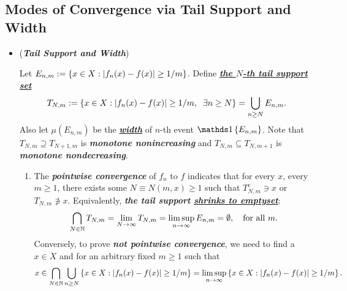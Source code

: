 \documentclass[11pt]{article}
\begin{document}
\subsection{Modes of Convergence via Tail Support and Width}
\begin{itemize}
\item \begin{remark} (\textit{\textbf{Tail Support and Width}})
\begin{definition}
Let $E_{n,m} := \left\{x \in X: \left\lvert f_n(x) - f(x) \right\rvert \ge 1/m\right\}$. Define \underline{\emph{\textbf{the $N$-th tail support set}}}
\begin{align*}
T_{N,m}:= \left\{x \in X: \left\lvert f_n(x) - f(x) \right\rvert \ge 1/m,\;\;\exists n\ge N\right\} = \bigcup_{n\ge N}E_{n,m}.
\end{align*} Also  let $\mu(E_{n,m})$ be the \underline{\emph{\textbf{width}}} of $n$-th event $\ind{E_{n, m}}$.  Note that $T_{N,m}\supseteq T_{N+1,m}$ is \emph{\textbf{monotone nonincreasing}} and  $T_{N,m}\subseteq T_{N,m+1}$ is \emph{\textbf{monotone nondecreasing}}.
\end{definition}
\begin{enumerate}
\item The \emph{\textbf{pointwise convergence}} of $f_{n}$ to $f$ indicates that for every $x$, every $m\ge 1$, there exists some $N \equiv N(m,x)\ge 1$ such that $ T_{N,m}^{c} \ni x$ or $T_{N, m} \not\ni x$.  Equivalently, \emph{\textbf{the tail support \underline{shrinks to emptyset}}}:
\begin{align*}
\bigcap_{N \in {\mathbb N}}T_{N,m} =  \lim\limits_{N\rightarrow \infty}T_{N,m} = \limsup\limits_{n\rightarrow \infty}E_{n,m} = \emptyset, \quad \text{for all }m.
\end{align*} Conversely, %
to prove \emph{\textbf{not pointwise convergence}}, we need to find a $x \in X$ and for an arbitrary fixed $m \ge 1$ such that 
\begin{align*}
x \in \bigcap_{N  \in {\mathbb N}}\bigcup_{n\ge N}\left\{x \in X: \left\lvert f_n(x) - f(x) \right\rvert \ge 1/m\right\} = \limsup\limits_{n\rightarrow \infty}\left\{x \in X: \left\lvert f_n(x) - f(x) \right\rvert \ge 1/m\right\}.
\end{align*} 


\end{enumerate}
\end{remark}
\end{itemize}
\end{document}
